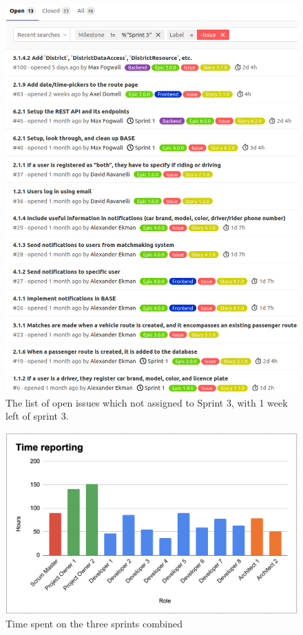 \documentclass{article}
\begin{document}
\begin{figure}[]
    \centering
    \includegraphics[scale=0.6]{pfrFigures/forgotten_issues.png}
    \caption{The list of open issues which not assigned to Sprint 3, with 1 week left of sprint 3.}
    \label{fig:forgotten_issues}
\end{figure}

\begin{figure}[]
    \centering
    \includegraphics[scale=0.6]{pfrFigures/TimeReporting.png}
    \caption{Time spent on the three sprints combined}
    \label{fig:timereport}
\end{figure}
\end{document}
